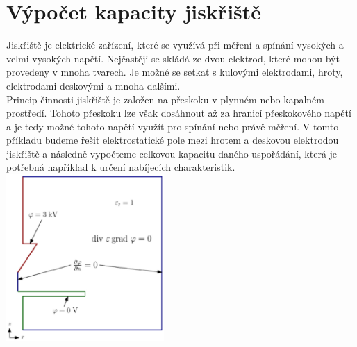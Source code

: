 \documentclass[a4paper, oneside]{article}
\begin{document}
\section{Výpočet kapacity jiskřiště}
Jiskřiště je elektrické zařízení, které se využívá při měření a spínání vysokých a velmi vysokých napětí. Nejčastěji se skládá ze dvou elektrod, které mohou být provedeny v mnoha tvarech. Je možné se setkat s kulovými elektrodami, hroty, elektrodami deskovými a mnoha dalšími.\\
Princip činnosti jiskřiště je založen na přeskoku v plynném nebo kapalném prostředí. Tohoto přeskoku lze však dosáhnout až za hranicí přeskokového napětí a je tedy možné tohoto napětí využít pro spínání nebo právě měření. V tomto příkladu budeme řešit elektrostatické pole mezi hrotem a deskovou elektrodou jiskřiště a následně vypočteme celkovou kapacitu daného uspořádání, která je potřebná například k určení nabíjecích charakteristik.\\
\includegraphics[width=6cm]{Matematicky_model_jiskriste.eps}\\
\end{document}
